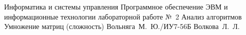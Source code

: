 \documentclass{bmstu}
\begin{document}
\makereporttitle
	{Информатика и системы управления} %
	{Программное обеспечение ЭВМ и информационные технологии} %
	{лабораторной работе №~2} %
	{Анализ алгоритмов} %
	{Умножение матриц (сложность)} %
	{} %
	{Вольняга~М.~Ю./ИУ7-56Б} %
	{Волкова~Л.~Л.} %

\maketableofcontents

%







\makebibliography
\end{document}
